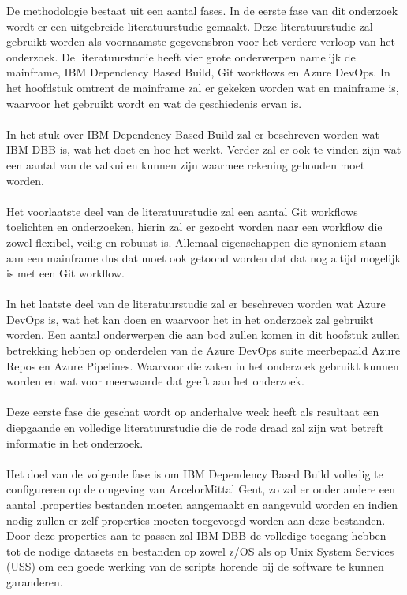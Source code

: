 De methodologie bestaat uit een aantal fases.
In de eerste fase van dit onderzoek wordt er een uitgebreide literatuurstudie gemaakt. 
Deze literatuurstudie zal gebruikt worden als voornaamste gegevensbron voor het verdere verloop van het onderzoek.
De literatuurstudie heeft vier grote onderwerpen namelijk de mainframe, IBM Dependency Based Build, Git workflows en Azure DevOps.
In het hoofdstuk omtrent de mainframe zal er gekeken worden wat en mainframe is, waarvoor het gebruikt wordt en wat de geschiedenis ervan is. 
\\ \\
In het stuk over IBM Dependency Based Build zal er beschreven worden wat IBM DBB is, wat het doet en hoe het werkt. 
Verder zal er ook te vinden zijn wat een aantal van de valkuilen kunnen zijn waarmee rekening gehouden moet worden.
\\ \\
Het voorlaatste deel van de literatuurstudie zal een aantal Git workflows toelichten en onderzoeken, hierin zal er gezocht worden naar een workflow die zowel flexibel, veilig en robuust is. 
Allemaal eigenschappen die synoniem staan aan een mainframe dus dat moet ook getoond worden dat dat nog altijd mogelijk is met een Git workflow. 
\\ \\ 
In het laatste deel van de literatuurstudie zal er beschreven worden wat Azure DevOps is, wat het kan doen en waarvoor het in het onderzoek zal gebruikt worden. 
Een aantal onderwerpen die aan bod zullen komen in dit hoofstuk zullen betrekking hebben op onderdelen van de Azure DevOps suite meerbepaald Azure Repos en Azure Pipelines. 
Waarvoor die zaken in het onderzoek gebruikt kunnen worden en wat voor meerwaarde dat geeft aan het onderzoek. 
\\ \\ 
Deze eerste fase die geschat wordt op anderhalve week heeft als resultaat een diepgaande en volledige literatuurstudie die de rode draad zal zijn wat betreft informatie in het onderzoek. 
\\ \\
Het doel van de volgende fase is om IBM Dependency Based Build volledig te configureren op de omgeving van ArcelorMittal Gent, 
zo zal er onder andere een aantal .properties bestanden moeten aangemaakt en aangevuld worden en indien nodig zullen er zelf properties moeten toegevoegd worden aan deze bestanden.
Door deze properties aan te passen zal IBM DBB de volledige toegang hebben tot de nodige datasets en bestanden op zowel z/OS als op Unix System Services (USS) om een goede werking van de scripts horende bij de software te kunnen garanderen.

